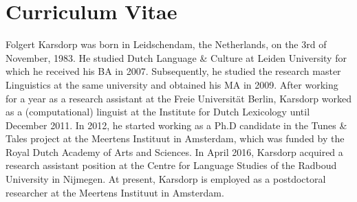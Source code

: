 
\chapter*{Curriculum Vitae}

\noindent Folgert Karsdorp was born in Leidschendam, the Netherlands, on the 3rd of November, 1983. He studied Dutch Language \& Culture at Leiden University for which he received his BA in 2007. Subsequently, he studied the research master Linguistics at the same university and obtained his MA in 2009. After working for a year as a research assistant at the Freie Universität Berlin, Karsdorp worked as a (computational) linguist at the Institute for Dutch Lexicology until December 2011. In 2012, he started working as a Ph.D candidate in the Tunes \& Tales project at the Meertens Instituut in Amsterdam, which was funded by the Royal Dutch Academy of Arts and Sciences. In April 2016, Karsdorp acquired a research assistant position at the Centre for Language Studies of the Radboud University in Nijmegen. At present, Karsdorp is employed as a postdoctoral researcher at the Meertens Instituut in Amsterdam.
\clearpage